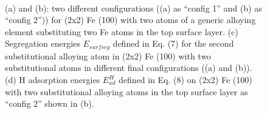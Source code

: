\newpage
\begingroup
\begin{figure}[!ht]
  \centering
  \label{Chap:Mg_H:fig:11a}
  \label{Chap:Mg_H:fig:11b}
  \\
  \label{Chap:Mg_H:fig:11c}
  \label{Chap:Mg_H:fig:11d} 
\caption[Effects of 6 p-block elements on higher surface alloying coverage]{(a) and (b): two different configurations ((a) as “config 1” and (b) as “config 2”)) for (2x2) Fe (100) with two atoms of a generic alloying element substituting two Fe atoms in the top surface layer. (c) Segregation energies $E_{surf seg}$ defined in Eq. (7) for the second substitutional alloying atom in (2x2) Fe (100) with two substitutional atoms in different final configurations ((a) and (b)). (d) H adsorption energies $E_{ad}^H$ defined in Eq. (8) on (2x2) Fe (100) with two substitutional alloying atoms in the top surface layer as “config 2” shown in (b).}
  \label{Chap:Mg_H:fig11}
\end{figure}
\endgroup